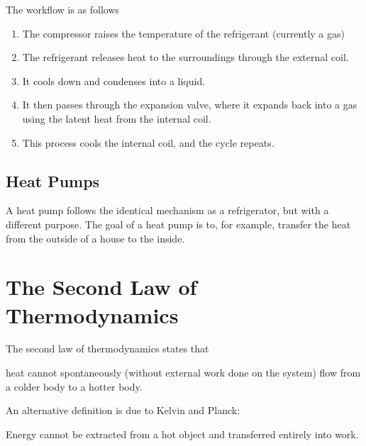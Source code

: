 \documentclass[a4paper,12pt]{article}
\let\oldsection\section
\renewcommand\section{\clearpage\oldsection}
\begin{document}
The workflow is as follows
\begin{enumerate}
  \item The compressor raises the temperature of the refrigerant (currently a gas)
  \item The refrigerant releases heat to the surroundings through the external coil.
  \item It cools down and condenses into a liquid.
  \item It then passes through the expansion valve, where it expands back into a gas using the latent heat from the internal coil.
  \item This process cools the internal coil, and the cycle repeats.
\end{enumerate}

\pagebreak

\subsection{Heat Pumps}

A heat pump follows the identical mechanism as a refrigerator, but with a different purpose. The goal of a heat pump is to, for example, transfer the heat from the outside of a house to the inside.

\section{The Second Law of Thermodynamics}

\begin{law}
  The second law of thermodynamics states that\\
  \begin{center}
    \begin{minipage}{0.9\textwidth}
      \begin{center}
        heat cannot spontaneously (without external work done on the system) flow from a colder body to a hotter body.
      \end{center}
    \end{minipage}
  \end{center}\vspace*{1cm}

  An alternative definition is due to Kelvin and Planck:\\
  \begin{center}
    \begin{minipage}{0.9\textwidth}
      \begin{center}
        Energy cannot be extracted from a hot object and transferred entirely into work.

      \end{center}

    \end{minipage}
  \end{center}

\end{law}
\end{document}
